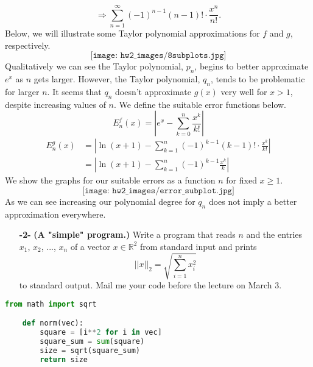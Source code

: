 \documentclass[11pt]{article}
\theoremstyle{definition}
\newcommand{\R}{\mathbb{R}}
\newcommand{\1}[1]{\mathbf{1} \left \{ #1 \right \}}
\begin{document}
\[\Longrightarrow \sum_{n=1}^{\infty} (-1)^{n-1} (n-1)! \cdot \frac{x^n}{n!}.\]
Below, we will illustrate some Taylor polynomial approximations for $f$ and $g$, respectively.
\[\texttt{[image: hw2\_images/8subplots.jpg]}\]
Qualitatively we can see the Taylor polynomial, $p_n$, begins to better approximate $e^x$ as $n$ gets larger.  However, the Taylor polynomial, $q_n$, tends to be problematic for larger $n$.  It seems that $q_n$ doesn't approximate $g(x)$ very well for $x>1$, despite increasing values of $n$.  We define the suitable error functions below.
\[E_n^f (x) = \left|e^x - \sum_{k=0}^n \frac{x^k}{k!}\right|\]
\begin{equation*}
    \begin{split}
        E_n^g (x) &= \left|\ln (x+1) - \sum_{k=1}^n (-1)^{k-1} (k-1)! \cdot \frac{x^k}{k!}\right| \\
        &= \left|\ln (x+1) - \sum_{k=1}^n (-1)^{k-1} \frac{x^k}{k}\right|
    \end{split}
\end{equation*}
We show the graphs for our suitable errors as a function $n$ for fixed $x \geq 1$.
\[\texttt{[image: hw2\_images/error\_subplot.jpg]}\]
As we can see increasing our polynomial degree for $q_n$ does not imply a better approximation everywhere.

\begin{itemize}
    \item[{\textbf{-2-}}] \textbf{(A "simple" program.)}  Write a program that reads $n$ and the entries $x_1$, $x_2$, ..., $x_n$ of a vector $x \in \R^2$ from standard input and prints
    \begin{equation*}
        ||x||_2 = \sqrt{\sum_{i=1}^n x_i^2}
    \end{equation*}
    to standard output.  Mail me your code before the lecture on March 3.
\end{itemize}
\begin{lstlisting}[language=Python]
    from math import sqrt

    def norm(vec):
        square = [i**2 for i in vec]
        square_sum = sum(square)
        size = sqrt(square_sum)
        return size
\end{lstlisting}
\end{document}
